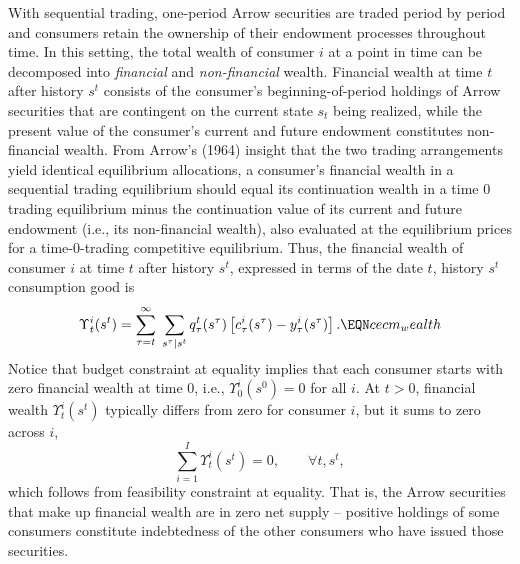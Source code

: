 With sequential trading,   
one-period Arrow securities are traded period by period and  consumers
retain the ownership of their endowment processes throughout time.
In this setting, the total
wealth of consumer $i$ at a point in time can be decomposed into  {\it financial}  and
 {\it non-financial} wealth.
Financial wealth at time $t$ after history $s^t$ consists of the consumer's
beginning-of-period holdings of Arrow securities that are contingent on
the current state $s_t$ being realized,
while the present value of the consumer's current and future endowment constitutes non-financial
wealth. From Arrow's (1964) insight that the two trading arrangements
yield  identical equilibrium allocations, a consumer's financial wealth
in a sequential trading equilibrium should  equal  its
continuation wealth in a time $0$ trading equilibrium minus the continuation value of
its current and future endowment
(i.e., its non-financial wealth), also evaluated at the equilibrium prices for a time-$0$-trading competitive equilibrium. Thus, the
financial wealth of consumer $i$ at time $t$ after history $s^t$,
expressed in terms of the date $t$, history $s^t$ consumption good is
$$
\Upsilon^i_t(s^t) =
\sum_{\tau=t}^\infty \; \sum_{s^\tau \vert s^t}
    q_\tau^t(s^\tau) \left[ c^i_\tau(s^\tau) - y_\tau^i(s^\tau) \right]. \EQN cecm_wealth$$
Notice that budget constraint  at equality implies that
each consumer starts  with zero financial wealth at time $0$, i.e., 
$\Upsilon^i_0(s^0)=0$ for all $i$. At $t >0$, financial wealth
$\Upsilon^i_t(s^t)$ typically differs from zero for consumer $i$,
but it sums to zero across $i$,
$$
\sum_{i=1}^{I}  \Upsilon^i_t(s^t) = 0, \qquad \forall t, s^t,
$$
which follows from feasibility constraint  at equality.
That is, the  Arrow securities that make up financial
wealth are in zero net supply -- positive holdings of some consumers
constitute indebtedness of the other consumers who have issued those
securities.





